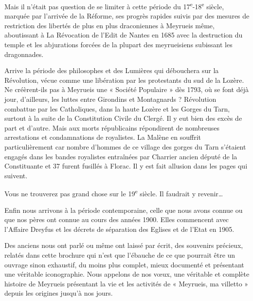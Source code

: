 

Mais il n’était pas question de se limiter à cette période du 17\textsuperscript{e}-18\textsuperscript{e} siècle, marquée par l’arrivée de la Réforme, ses progrès rapides suivis par des mesures de restriction des libertés de plus en plus draconiennes à Meyrueis même, aboutissant à La Révocation de l’Edit de Nantes en 1685 avec la destruction du temple et les abjurations forcées de la plupart des meyrueisiens subissant les dragonnades.

Arrive la période des philosophes et des Lumières qui débouchera sur la Révolution, vécue comme une libération par les protestants du sud de la Lozère. Ne créèrent-ils pas à Meyrueis une « Société Populaire » dès 1793, où se font déjà jour, d’ailleurs, les luttes entre Girondins et Montagnards ? Révolution combattue par les Catholiques, dans la haute Lozère et les Gorges du Tarn, surtout à la suite de la Constitution Civile du Clergé. Il y eut bien des excès de part et d’autre. Mais aux morts républicains répondirent de nombreuses arrestations et condamnations de royalistes. La Malène en souffrit particulièrement car nombre d'hommes de ce village des gorges du Tarn s’étaient engagés dans les bandes royalistes entraînées par Charrier ancien député de la Constituante et 37 furent fusillés à Florac. Il y est fait allusion dans les pages qui suivent.

Vous ne trouverez pas grand chose sur le 19\textsuperscript{e} siècle. Il faudrait y revenir…

Enfin nous arrivons à la période contemporaine, celle que nous avons connue ou que nos pères ont connue au cours des années 1900. Elles commencent avec l'Affaire Dreyfus et les décrets de séparation des Eglises et de l’Etat en 1905.

Des anciens nous ont parlé ou même ont laissé par écrit, des souvenirs précieux, relatés dans cette brochure qui n’est que l’ébauche de ce que pourrait être un ouvrage sinon exhaustif, du moins plus complet, mieux documenté et présentant une véritable iconographie. Nous appelons de nos vœux, une véritable et complète histoire de Meyrueis présentant la vie et les activités de « Meyrueis, ma villetto » depuis les origines jusqu’à nos jours.

\vspace{0.35em}

